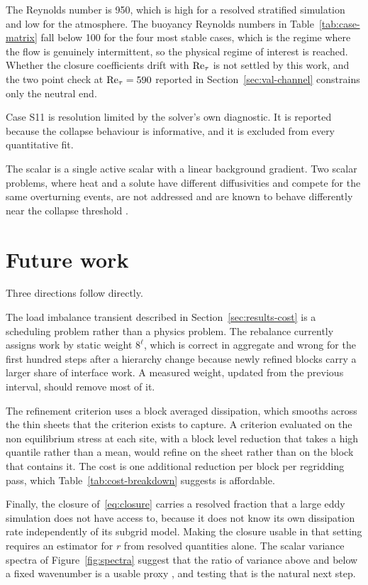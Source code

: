 The Reynolds number is 950, which is high for a resolved stratified simulation
and low for the atmosphere. The buoyancy Reynolds numbers in
Table~\ref{tab:case-matrix} fall below 100 for the four most stable cases, which
is the regime where the flow is genuinely intermittent, so the physical regime of
interest is reached. Whether the closure coefficients drift with $\mathrm{Re}_\tau$ is
not settled by this work, and the two point check at $\mathrm{Re}_\tau = 590$ reported
in Section~\ref{sec:val-channel} constrains only the neutral end.

Case S11 is resolution limited by the solver's own diagnostic. It is reported
because the collapse behaviour is informative, and it is excluded from every
quantitative fit.

The scalar is a single active scalar with a linear background gradient. Two
scalar problems, where heat and a solute have different diffusivities and
compete for the same overturning events, are not addressed and are known to
behave differently near the collapse threshold \citep{nakagawa2018twoscalar}.

\section{Future work}
\label{sec:conclusion-future}

Three directions follow directly.

The load imbalance transient described in Section~\ref{sec:results-cost} is a
scheduling problem rather than a physics problem. The rebalance currently
assigns work by static weight $8^{\ell}$, which is correct in aggregate and
wrong for the first hundred steps after a hierarchy change because newly refined
blocks carry a larger share of interface work. A measured weight, updated from
the previous interval, should remove most of it.

The refinement criterion uses a block averaged dissipation, which smooths across
the thin sheets that the criterion exists to capture. A criterion evaluated on
the non equilibrium stress at each site, with a block level reduction that takes
a high quantile rather than a mean, would refine on the sheet rather than on the
block that contains it. The cost is one additional reduction per block per
regridding pass, which Table~\ref{tab:cost-breakdown} suggests is affordable.

Finally, the closure of~\eqref{eq:closure} carries a resolved fraction that a
large eddy simulation does not have access to, because it does not know its own
dissipation rate independently of its subgrid model. Making the closure usable
in that setting requires an estimator for $r$ from resolved quantities alone.
The scalar variance spectra of Figure~\ref{fig:spectra} suggest that the ratio
of variance above and below a fixed wavenumber is a usable proxy
\citep{devereux2023les}, and testing that is the natural next step.
